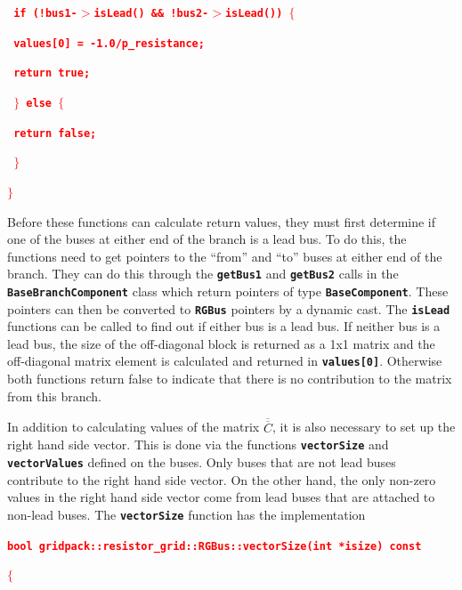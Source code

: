 \documentclass[12pt]{report} %
\begin{document}
\textcolor{red}{\texttt{\textbf{  if (!bus1-$\boldsymbol{\mathrm{>}}$isLead() \&\& !bus2-$\boldsymbol{\mathrm{>}}$isLead()) $\boldsymbol{\mathrm{\{}}$}}}

\textcolor{red}{\texttt{\textbf{    values[0] = -1.0/p\_resistance;}}}

\textcolor{red}{\texttt{\textbf{    return true;}}}

\textcolor{red}{\texttt{\textbf{  $\boldsymbol{\mathrm{\}}}$ else $\boldsymbol{\mathrm{\{}}$}}}

\textcolor{red}{\texttt{\textbf{    return false;}}}

\textcolor{red}{\texttt{\textbf{  $\boldsymbol{\mathrm{\}}}$}}}

\textcolor{red}{\texttt{\textbf{$\boldsymbol{\mathrm{\}}}$}}}

Before these functions can calculate return values, they must first determine if one of the buses at either end of the branch is a lead bus. To do this, the functions need to get pointers to the ``from'' and ``to'' buses at either end of the branch. They can do this through the \texttt{\textbf{getBus1}} and \texttt{\textbf{getBus2}} calls in the \texttt{\textbf{BaseBranchComponent}} class which return pointers of type \texttt{\textbf{BaseComponent}}. These pointers can then be converted to \texttt{\textbf{RGBus}} pointers by a dynamic cast. The \texttt{\textbf{isLead}} functions can be called to find out if either bus is a lead bus. If neither bus is a lead bus, the size of the off-diagonal block is returned as a 1x1 matrix and the off-diagonal matrix element is calculated and returned in \texttt{\textbf{values[0]}}. Otherwise both functions return false to indicate that there is no contribution to the matrix from this branch.

In addition to calculating values of the matrix $\overline{\overline{C}}$, it is also necessary to set up the right hand side vector. This is done via the functions \texttt{\textbf{vectorSize}} and \texttt{\textbf{vectorValues}} defined on the buses. Only buses that are not lead buses contribute to the right hand side vector. On the other hand, the only non-zero values in the right hand side vector come from lead buses that are attached to non-lead buses. The \texttt{\textbf{vectorSize}} function has the implementation

\textcolor{red}{\texttt{\textbf{bool gridpack::resistor\_grid::RGBus::vectorSize(int *isize) const}}}

\textcolor{red}{\texttt{\textbf{$\boldsymbol{\mathrm{\{}}$}}}
\end{document}
